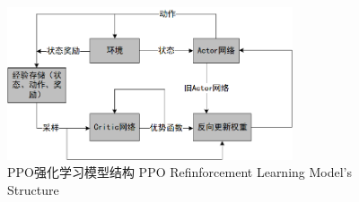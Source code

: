 



\begin{figure}[hbt]
	\centering
	\includegraphics[width=0.75\textwidth]{figures/2.6}
	\caption{PPO强化学习模型结构 PPO Refinforcement Learning Model's Structure}\label{fig:2.6}
\end{figure}



